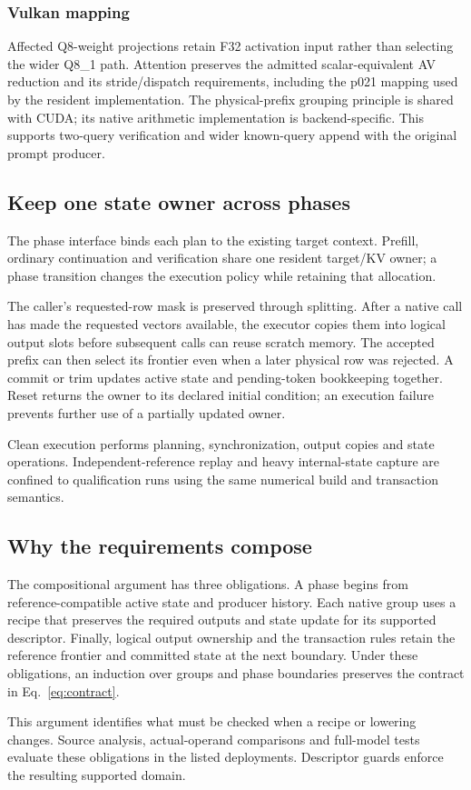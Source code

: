 \subsubsection{Vulkan mapping}
Affected Q8-weight projections retain F32 activation input rather than selecting the wider Q8\_1 path. Attention preserves the admitted scalar-equivalent AV reduction and its stride/dispatch requirements, including the p021 mapping used by the resident implementation. The physical-prefix grouping principle is shared with CUDA; its native arithmetic implementation is backend-specific. This supports two-query verification and wider known-query append with the original prompt producer.

\subsection{Keep one state owner across phases}
The phase interface binds each plan to the existing target context. Prefill, ordinary continuation and verification share one resident target/KV owner; a phase transition changes the execution policy while retaining that allocation.

The caller's requested-row mask is preserved through splitting. After a native call has made the requested vectors available, the executor copies them into logical output slots before subsequent calls can reuse scratch memory. The accepted prefix can then select its frontier even when a later physical row was rejected. A commit or trim updates active state and pending-token bookkeeping together. Reset returns the owner to its declared initial condition; an execution failure prevents further use of a partially updated owner.

Clean execution performs planning, synchronization, output copies and state operations. Independent-reference replay and heavy internal-state capture are confined to qualification runs using the same numerical build and transaction semantics.

\subsection{Why the requirements compose}
The compositional argument has three obligations. A phase begins from reference-compatible active state and producer history. Each native group uses a recipe that preserves the required outputs and state update for its supported descriptor. Finally, logical output ownership and the transaction rules retain the reference frontier and committed state at the next boundary. Under these obligations, an induction over groups and phase boundaries preserves the contract in Eq.~\eqref{eq:contract}.

This argument identifies what must be checked when a recipe or lowering changes. Source analysis, actual-operand comparisons and full-model tests evaluate these obligations in the listed deployments. Descriptor guards enforce the resulting supported domain.
